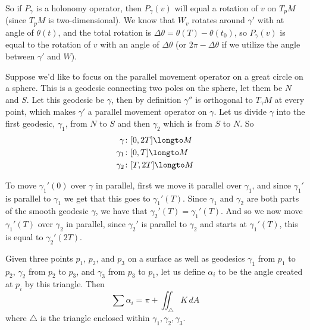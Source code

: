 So if $P_\gamma$ is a holonomy operator, then $P_\gamma(v)$ will equal a rotation of $v$ on $T_pM$ (since $T_pM$ is two-dimensional).
We know that $W_v$ rotates around $\gamma'$ with at angle of $\theta(t)$, and the total rotation is $\Delta\theta=\theta(T)-\theta(t_0)$, so $P_\gamma(v)$ is equal to the rotation of $v$ with an angle of
$\Delta\theta$ (or $2\pi-\Delta\theta$ if we utilize the angle between $\gamma'$ and $W$).

\begin{exam*}

    Suppose we'd like to focus on the parallel movement operator on a great circle on a sphere.
    This is a geodesic connecting two poles on the sphere, let them be $N$ and $S$.
    Let this geodesic be $\gamma$, then by definition $\gamma''$ is orthogonal to $T_\gamma M$ at every point, which makes $\gamma'$ a parallel movement operator on $\gamma$.
    Let us divide $\gamma$ into the first geodesic, $\gamma_1$, from $N$ to $S$ and then $\gamma_2$ which is from $S$ to $N$.
    So
    \begin{align*}
        \gamma\colon&[0,2T]\longto M\\
        \gamma_1\colon&[0,T]\longto M\\
        \gamma_2\colon&[T,2T]\longto M\\
    \end{align*}

    To move $\gamma_1'(0)$ over $\gamma$ in parallel, first we move it parallel over $\gamma_1$, and since $\gamma_1'$ is parallel to $\gamma_1$ we get that this goes to $\gamma_1'(T)$.
    Since $\gamma_1$ and $\gamma_2$ are both parts of the smooth geodesic $\gamma$, we have that $\gamma_2'(T)=\gamma_1'(T)$.
    And so we now move $\gamma_1'(T)$ over $\gamma_2$ in parallel, since $\gamma_2'$ is parallel to $\gamma_2$ and starts at $\gamma_1'(T)$, this is equal to $\gamma_2'(2T)$.

\end{exam*}

\begin{thrm*}

    Given three points $p_1$, $p_2$, and $p_3$ on a surface as well as geodesics $\gamma_1$ from $p_1$ to $p_2$, $\gamma_2$ from $p_2$ to $p_3$, and $\gamma_3$ from $p_3$ to $p_1$, let us define
    $\alpha_i$ to be the angle created at $p_i$ by this triangle.
    Then
    \[ \sum \alpha_i = \pi + \iint_\triangle K\,dA \]
    where $\triangle$ is the triangle enclosed within $\gamma_1,\gamma_2,\gamma_3$.

\end{thrm*}

